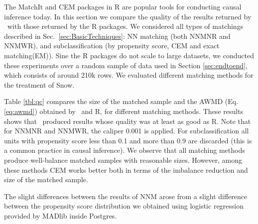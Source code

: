 The MatchIt and CEM packages in R are popular tools for conducting
causal inference today.  In this section we compare the quality of the
results returned by \GSQL\ with those returned by the R packages.  We
considered all types of matchings described in
Sec.~\ref{sec:BasicTechniques}: NN matching (both NNMNR and NNMWR),
and subclassification (by propensity score, CEM and exact matching(EM)).  Sine the R
packages do not scale to large datasets, we conducted these
experiments over a random sample of data used in Section
\ref{sec:endtoend}, which consists of around 210k rows. We evaluated
different matching methods for the treatment of Snow.


Table \ref{tbl:qc} compares the size of the matched sample and the
AWMD (Eq.\ref{eq:awmd}) obtained by \GSQL \ and R, for different
matching methods.  These results shows that \GSQL\ produced results
whose quality was at least as good as R.  Note that for NNMNR and
NNMWR, the caliper 0.001 is applied.   For subclassification all units with
propensity score less than 0.1 and more than 0.9 are discarded (this
is a common practice in causal inference). We observe that all
matching methods produce well-balance matched samples with reasonable
sizes. However, among these methods CEM works better both in terms of
the imbalance reduction and size of the matched sample.

The slight differences between
the results of NNM arose from a slight
difference between the propensity score distribution we obtained using logistic regression provided by MADlib inside Postgres. 




